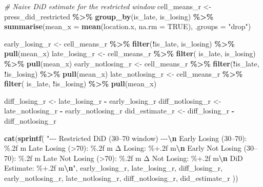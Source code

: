 \documentclass[
]{article}
\newenvironment{Shaded}{\begin{snugshade}}{\end{snugshade}}
\newcommand{\AttributeTok}[1]{\textcolor[rgb]{0.13,0.29,0.53}{#1}}
\newcommand{\CommentTok}[1]{\textcolor[rgb]{0.56,0.35,0.01}{\textit{#1}}}
\newcommand{\ConstantTok}[1]{\textcolor[rgb]{0.56,0.35,0.01}{#1}}
\newcommand{\FunctionTok}[1]{\textcolor[rgb]{0.13,0.29,0.53}{\textbf{#1}}}
\newcommand{\NormalTok}[1]{#1}
\newcommand{\OtherTok}[1]{\textcolor[rgb]{0.56,0.35,0.01}{#1}}
\newcommand{\SpecialCharTok}[1]{\textcolor[rgb]{0.81,0.36,0.00}{\textbf{#1}}}
\newcommand{\StringTok}[1]{\textcolor[rgb]{0.31,0.60,0.02}{#1}}
\begin{document}
\begin{Shaded}
\begin{Highlighting}[]
\CommentTok{\# Naive DiD estimate for the restricted window}
\NormalTok{cell\_means\_r }\OtherTok{\textless{}{-}}\NormalTok{ press\_did\_restricted }\SpecialCharTok{\%\textgreater{}\%}
  \FunctionTok{group\_by}\NormalTok{(is\_late, is\_losing) }\SpecialCharTok{\%\textgreater{}\%}
  \FunctionTok{summarise}\NormalTok{(}\AttributeTok{mean\_x =} \FunctionTok{mean}\NormalTok{(location.x, }\AttributeTok{na.rm =} \ConstantTok{TRUE}\NormalTok{), }\AttributeTok{.groups =} \StringTok{"drop"}\NormalTok{)}

\NormalTok{early\_losing\_r    }\OtherTok{\textless{}{-}}\NormalTok{ cell\_means\_r }\SpecialCharTok{\%\textgreater{}\%} \FunctionTok{filter}\NormalTok{(}\SpecialCharTok{!}\NormalTok{is\_late,  is\_losing) }\SpecialCharTok{\%\textgreater{}\%} \FunctionTok{pull}\NormalTok{(mean\_x)}
\NormalTok{late\_losing\_r     }\OtherTok{\textless{}{-}}\NormalTok{ cell\_means\_r }\SpecialCharTok{\%\textgreater{}\%} \FunctionTok{filter}\NormalTok{( is\_late,  is\_losing) }\SpecialCharTok{\%\textgreater{}\%} \FunctionTok{pull}\NormalTok{(mean\_x)}
\NormalTok{early\_notlosing\_r }\OtherTok{\textless{}{-}}\NormalTok{ cell\_means\_r }\SpecialCharTok{\%\textgreater{}\%} \FunctionTok{filter}\NormalTok{(}\SpecialCharTok{!}\NormalTok{is\_late, }\SpecialCharTok{!}\NormalTok{is\_losing) }\SpecialCharTok{\%\textgreater{}\%} \FunctionTok{pull}\NormalTok{(mean\_x)}
\NormalTok{late\_notlosing\_r  }\OtherTok{\textless{}{-}}\NormalTok{ cell\_means\_r }\SpecialCharTok{\%\textgreater{}\%} \FunctionTok{filter}\NormalTok{( is\_late, }\SpecialCharTok{!}\NormalTok{is\_losing) }\SpecialCharTok{\%\textgreater{}\%} \FunctionTok{pull}\NormalTok{(mean\_x)}

\NormalTok{diff\_losing\_r    }\OtherTok{\textless{}{-}}\NormalTok{ late\_losing\_r    }\SpecialCharTok{{-}}\NormalTok{ early\_losing\_r}
\NormalTok{diff\_notlosing\_r }\OtherTok{\textless{}{-}}\NormalTok{ late\_notlosing\_r }\SpecialCharTok{{-}}\NormalTok{ early\_notlosing\_r}
\NormalTok{did\_estimate\_r   }\OtherTok{\textless{}{-}}\NormalTok{ diff\_losing\_r    }\SpecialCharTok{{-}}\NormalTok{ diff\_notlosing\_r}

\FunctionTok{cat}\NormalTok{(}\FunctionTok{sprintf}\NormalTok{(}
  \StringTok{"{-}{-}{-} Restricted DiD (30–70 window) {-}{-}{-}}\SpecialCharTok{\textbackslash{}n}
\StringTok{  Early Losing (30–70\textquotesingle{}):     \%.2f m}
\StringTok{  Late Losing  (\textgreater{}70\textquotesingle{}):       \%.2f m}
\StringTok{  Δ Losing:                 \%+.2f m}\SpecialCharTok{\textbackslash{}n}
\StringTok{  Early Not Losing (30–70\textquotesingle{}): \%.2f m}
\StringTok{  Late Not Losing  (\textgreater{}70\textquotesingle{}):   \%.2f m}
\StringTok{  Δ Not Losing:              \%+.2f m}\SpecialCharTok{\textbackslash{}n}
\StringTok{  DiD Estimate:              \%+.2f m}\SpecialCharTok{\textbackslash{}n}\StringTok{"}\NormalTok{,}
\NormalTok{  early\_losing\_r, late\_losing\_r, diff\_losing\_r,}
\NormalTok{  early\_notlosing\_r, late\_notlosing\_r, diff\_notlosing\_r,}
\NormalTok{  did\_estimate\_r}
\NormalTok{))}
\end{Highlighting}
\end{Shaded}
\end{document}
